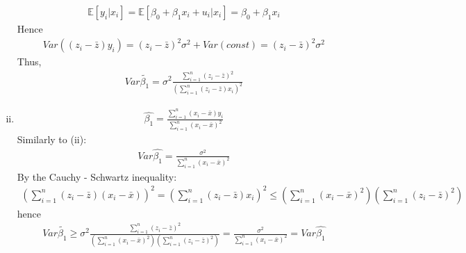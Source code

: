 \documentclass[a4paper]{article}
\newcommand{\expect}{\mathbb{E}}
\newcommand{\summa}{\sum_{i=1}^n}
\begin{document}
\begin{enumerate}[(i)]
\begin{align*}
	\expect[y_i|x_i] = \expect[\beta_0 + \beta_1x_i + u_i|x_i] = \beta_0 + \beta_1x_i
	\end{align*}
	Hence
	\begin{align*}
	Var ((z_i - \bar{z})y_i) = (z_i - \bar{z})^2\sigma^2 + Var(const) = (z_i - \bar{z})^2\sigma^2
	\end{align*}
	Thus, 
	\begin{align*}
	Var \tilde{\beta_1} = \sigma^2 \frac{\sum_{i=1}^n (z_i -  \bar{z})^2}{\left(\sum_{i=1}^n (z_i - \bar{z})x_i\right)^2}
	\end{align*}
	\item 
	\begin{align*}
	\hat{\beta_1} = \frac{\sum_{i=1}^n(x_i - \bar{x})y_i}{\sum_{i=1}^n(x_i - \bar{x})^2}
	\end{align*}
	Similarly to (ii):
	\begin{align*}
	Var \hat{\beta_1} = \frac{ \sigma^2}{\sum_{i=1}^n(x_i - \bar{x})^2}
	\end{align*}
	By the Cauchy - Schwartz inequality:
	\begin{align*}
	\left(\sum_{i=1}^n (z_i - \bar{z})(x_i - \bar{x})\right)^2 = \left(\sum_{i=1}^n (z_i - \bar{z})x_i\right)^2 \le \left(\sum_{i=1}^n (x_i - \bar{x})^2\right) \left(\sum_{i=1}^n (z_i - \bar{z})^2\right)
	\end{align*} 
	hence
	\begin{align*}
	Var \tilde{\beta_1} \ge \sigma^2 \frac{\summa (z_i - \bar{z})^2}{\left(\sum_{i=1}^n (x_i - \bar{x})^2\right) \left(\sum_{i=1}^n (z_i - \bar{z})^2\right)} = \frac{ \sigma^2}{\sum_{i=1}^n(x_i - \bar{x})^2} = Var \hat{\beta_1}
	\end{align*}
\end{enumerate}
\end{document}
